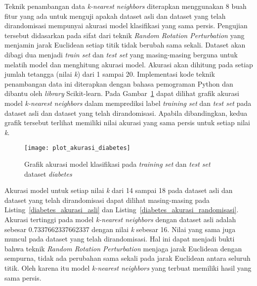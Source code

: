 Teknik penambangan data \textit{k-nearest neighbors} diterapkan menggunakan 8 buah fitur yang ada untuk menguji apakah dataset asli dan dataset yang telah dirandomisasi mempunyai akurasi model klasifikasi yang sama persis. Pengujian tersebut didasarkan pada sifat dari teknik \textit{Random Rotation Perturbation} yang menjamin jarak Euclidean setiap titik tidak berubah sama sekali. Dataset akan dibagi dua menjadi \textit{train set} dan \textit{test set} yang masing-masing berguna untuk melatih model dan menghitung akurasi model. Akurasi akan dihitung pada setiap jumlah tetangga (nilai \textit{k}) dari 1 sampai 20. Implementasi kode teknik penambangan data ini diterapkan dengan bahasa pemograman Python dan dibantu oleh \textit{library} Scikit-learn. Pada Gambar~\ref{fig:plot_akurasi_diabetes} dapat dilihat grafik akurasi model \textit{k-nearest neighbors} dalam memprediksi label \textit{training set} dan \textit{test set} pada dataset asli dan dataset yang telah dirandomisasi. Apabila dibandingkan, kedua grafik tersebut terlihat memiliki nilai akurasi yang sama persis untuk setiap nilai \textit{k}. 

\begin{figure}
	\centering
	\texttt{[image: plot\_akurasi\_diabetes]}
	\caption{Grafik akurasi model klasifikasi pada \textit{training set} dan \textit{test set} dataset \textit{diabetes}}
	\label{fig:plot_akurasi_diabetes}
\end{figure}

Akurasi model untuk setiap nilai \textit{k} dari 14 sampai 18 pada dataset asli dan dataset yang telah dirandomisasi dapat dilihat masing-masing pada Listing~\ref{diabetes_akurasi_asli} dan Listing~\ref{diabetes_akurasi_randomisasi}. Akurasi tertinggi pada model \textit{k-nearest neighbors} dengan dataset asli adalah sebesar 0.7337662337662337 dengan nilai \textit{k} sebesar 16. Nilai yang sama juga muncul pada dataset yang telah dirandomisasi. Hal ini dapat menjadi bukti bahwa teknik \textit{Random Rotation Perturbation} menjaga jarak Euclidean dengan sempurna, tidak ada perubahan sama sekali pada jarak Euclidean antara seluruh titik. Oleh karena itu model \textit{k-nearest neighbors} yang terbuat memiliki hasil yang sama persis.

